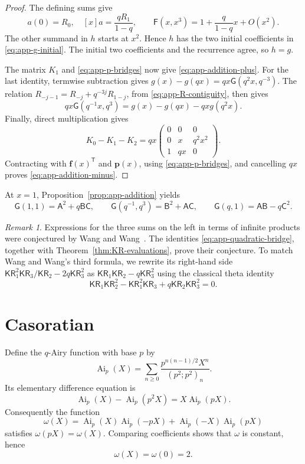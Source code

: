 \documentclass[11pt]{article}
\numberwithin{equation}{section}
\theoremstyle{remark}
\newtheorem{remark}[theorem]{Remark}
\newcommand{\KR}{\mathsf{KR}}
\begin{document}
\begin{proof}
The defining sums give
\[
 a(0)=R_0,\quad [x]a=\frac{qR_1}{1-q},\qquad
 \mathsf F(x,x^3)=1+\frac{q}{1-q}x+O(x^2).
\]
The other summand in \(h\) starts at \(x^2\).  Hence \(h\) has
the two initial coefficients in \eqref{eq:app-g-initial}.
The initial two coefficients and the recurrence agree, so \(h=g\).

The matrix \(K_1\) and \eqref{eq:app-p-bridges} now give
\eqref{eq:app-addition-plus}. For the last identity, termwise
subtraction gives \(g(x)-g(qx)=qx\mathsf G(q^2x,q^{-3})\).
The relation \(R_{-j-1}=R_{-j}+q^{-3j}R_{1-j}\), from
\eqref{eq:app-R-contiguity}, then gives
\[
 qx\mathsf G(q^{-1}x,q^3)=g(x)-g(qx)-qxg(q^2x).
\]
Finally, direct multiplication gives
\[
 K_0-K_1-K_2
       =qx\begin{pmatrix}0&0&0\\0&x&q^2x^2\\1&qx&0\end{pmatrix}.
\]
Contracting with \(\mathbf f(x)^{\mathsf T}\) and \(\mathbf p(x)\),
using \eqref{eq:app-p-bridges}, and cancelling \(qx\) proves
\eqref{eq:app-addition-minus}.
\end{proof}

At \(x=1\), Proposition~\ref{prop:app-addition} yields
\begin{equation}\label{eq:app-quadratic-bridge}
 \mathsf G(1,1)=\mathsf A^2+q\mathsf B\mathsf C,\qquad
 \mathsf G(q^{-1},q^3)=\mathsf B^2+\mathsf A\mathsf C,\qquad
 \mathsf G(q,1)=\mathsf A\mathsf B-q\mathsf C^2.
\end{equation}
\begin{remark}
Expressions for the three sums on the left in terms of infinite products were conjectured
by Wang and Wang~\cite[Conjecture 3.7]{WangWang2026}.
The identities \eqref{eq:app-quadratic-bridge}, together with Theorem~\ref{thm:KR-evaluations}, prove their conjecture.
To match Wang and Wang's third formula, we rewrite its right-hand side
\(\KR_1^2\KR_3/\KR_2-2q\KR_3^2\) as \(\KR_1\KR_2-q\KR_3^2\)
using the classical theta identity
\[
 \KR_1\KR_2^2-\KR_1^2\KR_3+q\KR_2\KR_3^2=0.
\]
\end{remark}

\section{Casoratian}
\label{app:casoratian}

Define the \(q\)-Airy function with base \(p\) by
\[
 \operatorname{Ai}_p(X)=\sum_{n\geq0}
       \frac{p^{n(n-1)/2}X^n}{(p^2;p^2)_n}.
\]
Its elementary difference equation is
\begin{equation}\label{eq:app-Ai-contiguity}
 \operatorname{Ai}_p(X)-\operatorname{Ai}_p(p^2X)
       =X\operatorname{Ai}_p(pX).
\end{equation}
Consequently the function
\[
 \omega(X)=\operatorname{Ai}_p(X)\operatorname{Ai}_p(-pX)
       +\operatorname{Ai}_p(-X)\operatorname{Ai}_p(pX)
\]
satisfies \(\omega(pX)=\omega(X)\). Comparing coefficients shows that \(\omega\) is constant, hence
\begin{equation}\label{eq:app-Ai-Wronskian}
 \omega(X)=\omega(0)=2.
\end{equation}
\end{document}
